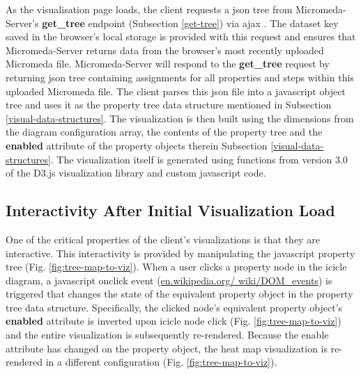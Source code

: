 As the visualisation page loads, the client requests a \gls{json} tree from 
Micromeda-Server's \textbf{get\_tree} endpoint (Subsection \ref{get-tree}) via 
\gls{ajax} . The dataset key saved in the browser's local storage is provided 
with this request and ensures that Micromeda-Server returns data from the 
browser's most recently uploaded Micromeda file. Micromeda-Server will respond 
to the \textbf{get\_tree} request by returning \gls{json} tree containing 
assignments for all properties and steps within this uploaded Micromeda file. 
The client parses this \gls{json} file into a \gls{javascript} object tree and 
uses it as the property tree data structure mentioned in Subsection 
\ref{visual-data-structures}. The visualization is then built using the 
dimensions from the diagram configuration array, the contents of the property 
tree and the \textbf{enabled} attribute of the property objects therein 
Subsection \ref{visual-data-structures}. The visualization itself is generated 
using functions from version 3.0 of the D3.js visualization library 
\cite{bostock2015d3} and custom \gls{javascript} code.

\subsection{Interactivity After Initial Visualization Load}

One of the critical properties of the client's visualizations is that they are 
interactive. This interactivity is provided by manipulating the \gls{javascript} 
property tree (Fig. \ref{fig:tree-map-to-viz}). When a user clicks a property 
node in the icicle diagram, a \gls{javascript} onclick event \cite{dom-events} 
(\href{http://en.wikipedia.org/wiki/DOM_events}{en.wikipedia.org/ 
wiki/DOM\_events}) is triggered that changes the state of the equivalent 
property object in the property tree data structure. Specifically, the clicked 
node's equivalent property object's \textbf{enabled} attribute is inverted upon 
icicle node click (Fig. \ref{fig:tree-map-to-viz}) and the entire visualization 
is subsequently re-rendered. Because the enable attribute has changed on the 
property object, the heat map visualization is re-rendered in a different 
configuration (Fig. \ref{fig:tree-map-to-viz}). 

